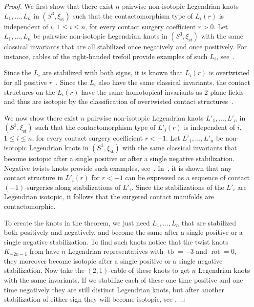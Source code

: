 \documentclass[11pt]{amsart} %
\DeclareMathOperator{\tb}{tb}
\DeclareMathOperator{\rot}{rot}
\newcommand{\xist}{\xi_{\mathrm{st}}}
\theoremstyle{plain}
\theoremstyle{definition}
\begin{document}
\begin{proof}
We first show that there exist $n$ pairwise non-isotopic Legendrian knots $L_1,\ldots, L_n$ in $(S^3,\xist)$ such that the contactomorphism type of $L_i(r)$ is independent of $i$, $1\leq i\leq n$, for every contact surgery coefficient $r>0$.
Let $L_1,\ldots, L_n$ be pairwise non-isotopic Legendrian knots in $(S^3,\xist)$ with the same classical invariants that are all stabilized once negatively and once positively. For instance, cables of the right-handed trefoil provide examples of such $L_i$, see~\cite{EtnyreLafountainTosun12}.
	
Since the $L_i$ are stabilized with both signs, it is known that $L_i(r)$ is overtwisted for all positive $r$~\cite{EtnyreKegelOnaranPre}. Since the $L_i$ also have the same classical invariants, the contact structures on the $L_i(r)$ have the same homotopical invariants as $2$-plane fields and thus are isotopic by the classification of overtwisted contact structures~\cite{Eliashberg89}.
	
We now show there exist $n$ pairwise non-isotopic Legendrian knots $L'_1,\ldots, L'_n$ in $(S^3,\xist)$ such that the contactomorphism type of $L'_i(r)$ is independent of $i$, $1\leq i\leq n$, for every contact surgery coefficient $r<-1$. Let $L'_1,\ldots, L'_n$ be non-isotopic Legendrian knots in $(S^3,\xist)$ with the same classical invariants that become isotopic after a single positive or after a single negative stabilization. Negative twists knots provide such examples, see~\cite{EtnyreNgVertesi13}. In~\cite{DingGeigesStipsicz04},  it is shown that any contact structure in $L'_i(r)$ for $r<-1$ can be expressed as a sequence of contact $(-1)$-surgeries along stabilizations of $L'_i$. Since the stabilizations of the $L'_i$ are Legendrian isotopic, it follows that the surgered contact manifolds are contactomorphic.

To create the knots in the theorem, we just need $L_1,\ldots, L_n$ that are stabilized both positively and negatively, and become the same after a single positive or a single negative stabilization. To find such knots notice that the twist knots $K_{-2n-1}$ from \cite{EtnyreNgVertesi13} have $n$ Legendrian representatives with $\tb=-3$ and $\rot=0$, they moreover become isotopic after a single positive or a single negative stabilization. Now take the $(2,1)$-cable of these knots to get $n$ Legendrian knots with the same invariants. If we stabilize each of these one time positive and one time negatively they are still distinct Legendrian knots, but after another stabilization of either sign they will become isotopic, see \cite{ChakrabortyEtnyreMin20pre}.
\end{proof}
\end{document}

